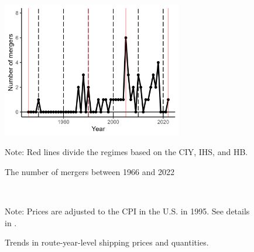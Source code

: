\documentclass[10pt]{article}
\begin{document}
\begin{figure}[!ht]
\begin{center}
  \includegraphics[width = 0.7\textwidth]
  {figuretable/number_of_mergers.png}
  \caption{The number of mergers between 1966 and 2022}
  \label{fg:number_of_mergers}
  \end{center}
\footnotesize
   Note: Red lines divide the regimes based on the CIY, IHS, and HB.
\end{figure}

\begin{figure}[!ht]
\begin{center}
  \\
  \caption{Trends in route-year-level shipping prices and quantities.}
  \label{fg:container_freight_rate_and_shipping_quantity_each_route}
  \end{center}
\footnotesize
  Note: Prices are adjusted to the CPI in the U.S. in 1995. See details in \cite{matsuda2022unified}.
\end{figure}
\end{document}
